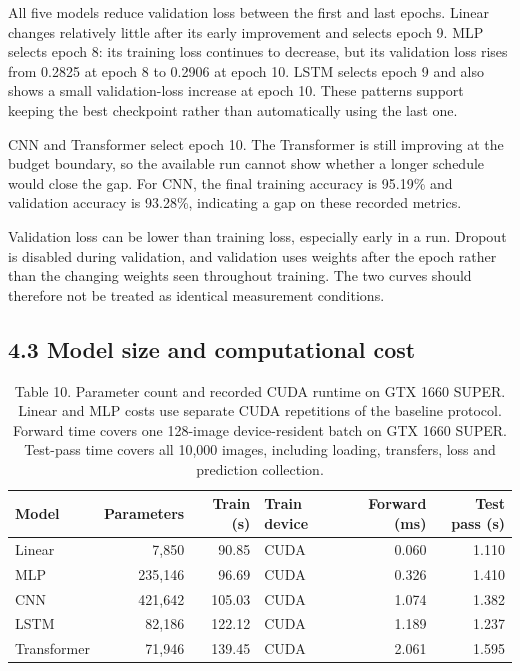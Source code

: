All five models reduce validation loss between the first and last epochs.
Linear changes relatively little after its early improvement and selects
epoch 9. MLP selects epoch 8: its training loss continues to decrease, but its
validation loss rises from 0.2825 at epoch 8 to 0.2906 at epoch 10.
LSTM selects epoch 9 and also shows a small validation-loss increase at epoch 10.
These patterns support keeping the best checkpoint rather than automatically
using the last one.

CNN and Transformer select epoch 10. The Transformer is still improving at
the budget boundary, so the available run cannot show whether a longer schedule
would close the gap. For CNN, the final training accuracy is 95.19\% and validation
accuracy is 93.28\%, indicating a gap on these recorded metrics.

Validation loss can be lower than training loss, especially early in a run.
Dropout is disabled during validation, and validation uses weights after the
epoch rather than the changing weights seen throughout training.
The two curves should therefore not be treated as identical measurement conditions.


\subsection{4.3 Model size and computational cost}
\begin{table}[H]\centering
\caption{Table 10. Parameter count and recorded CUDA runtime on GTX 1660 SUPER.
Linear and MLP costs use separate CUDA repetitions of the baseline protocol.
Forward time covers one
128-image device-resident batch on GTX 1660 SUPER. Test-pass time covers all
10,000 images, including loading, transfers, loss and prediction collection.}
\label{tab:runtime}
\small
\begin{tabular}{lrrlrr}\toprule
Model & Parameters & Train (s) & Train device & Forward (ms) & Test pass (s)\\\midrule
Linear & 7,850 & 90.85 & CUDA & 0.060 & 1.110\\
MLP & 235,146 & 96.69 & CUDA & 0.326 & 1.410\\
CNN & 421,642 & 105.03 & CUDA & 1.074 & 1.382\\
LSTM & 82,186 & 122.12 & CUDA & 1.189 & 1.237\\
Transformer & 71,946 & 139.45 & CUDA & 2.061 & 1.595\\

\bottomrule\end{tabular}
\end{table}

